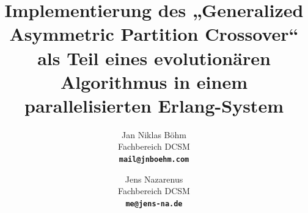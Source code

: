 
\title{Implementierung des „Generalized Asymmetric Partition Crossover“
als Teil eines evolutionären Algorithmus in einem parallelisierten
Erlang-System}

\author{Jan Niklas Böhm\\ Fachbereich DCSM\\ \textbf{\texttt{mail@jnboehm.com}}\\
            \and
        Jens Nazarenus\\ Fachbereich DCSM\\ \textbf{\texttt{me@jens-na.de}}}

